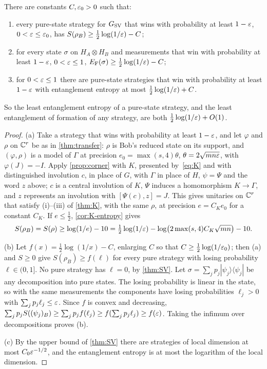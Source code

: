 \begin{theorem}\label{thm:SV-entropy}
There are constants $C,\varepsilon_0>0$ such that:
\begin{enumerate}[label=(\alph*),itemsep=1pt]
\item every pure-state strategy for $G_{\mathrm{SV}}$ that wins with probability at least $1-\varepsilon$, $0<\varepsilon\le\varepsilon_0$, has
$S(\rho_B)\ge\frac12\log(1/\varepsilon)-C$;
\item for every state $\sigma$ on $H_A\otimes H_B$ and measurements that win with probability at least $1-\varepsilon$,
$0<\varepsilon\le1$, $E_{\mathrm F}(\sigma)\ge\frac12\log(1/\varepsilon)-C$;
\item for $0<\varepsilon\le1$ there are pure-state strategies that win with probability at least $1-\varepsilon$ with entanglement
entropy at most $\frac12\log(1/\varepsilon)+C$.
\end{enumerate}
So the least entanglement entropy of a pure-state strategy, and the least entanglement of formation of any strategy,
are both $\frac12\log(1/\varepsilon)+O(1)$.
\end{theorem}

\begin{proof}
(a) Take a strategy that wins with probability at least $1-\varepsilon$, and let $\varphi$ and $\rho$ on $\mathbb C^r$ be as in
\cref{thm:transfer}: $\rho$ is Bob's reduced state on its support, and $(\varphi,\rho)$ is a model of $\Gamma$ at precision
$e_0=\max(s,4)\theta$, $\theta=2\sqrt{mn\varepsilon}$, with $\varphi(J)=-I$. Apply \cref{prop:corner} with $K$, presented
by~\eqref{eq:K} and with distinguished involution $c$, in place of $G$, with $\Gamma$ in place of $H$, $\psi=\Psi$ and the
word $z$ above; $c$ is a central involution of $K$, $\Psi$ induces a homomorphism $K\to\Gamma$, and $z$ represents an
involution with $[\Psi(c),z]=J$. This gives unitaries on $\mathbb C^r$ that satisfy (i)--(iii) of \cref{thm:K}, with the same
$\rho$, at precision $e=C_Ke_0$ for a constant $C_K$. If $e\le\frac12$, \cref{cor:K-entropy} gives
\[
S(\rho_B)=S(\rho)\ge\log(1/e)-10=\tfrac12\log(1/\varepsilon)-\log\bigl(2\max(s,4)C_K\sqrt{mn}\bigr)-10 .
\]

(b) Let $f(x)=\frac12\log(1/x)-C$, enlarging $C$ so that $C\ge\frac12\log(1/\varepsilon_0)$; then (a) and $S\ge0$ give
$S(\rho_B)\ge f(\ell)$ for every pure strategy with losing probability $\ell\in(0,1]$. No pure strategy has $\ell=0$, by
\cref{thm:SV}. Let $\sigma=\sum_jp_j|\psi_j\rangle\langle\psi_j|$ be any decomposition into pure states. The losing
probability is linear in the state, so with the same measurements the components have losing probabilities $\ell_j>0$
with $\sum_jp_j\ell_j\le\varepsilon$. Since $f$ is convex and decreasing, $\sum_jp_jS((\psi_j)_B)\ge\sum_jp_jf(\ell_j)\ge
f(\sum_jp_j\ell_j)\ge f(\varepsilon)$. Taking the infimum over decompositions proves (b).

(c) By the upper bound of \cref{thm:SV} there are strategies of local dimension at most $C_0\varepsilon^{-1/2}$, and the entanglement
entropy is at most the logarithm of the local dimension.
\end{proof}

